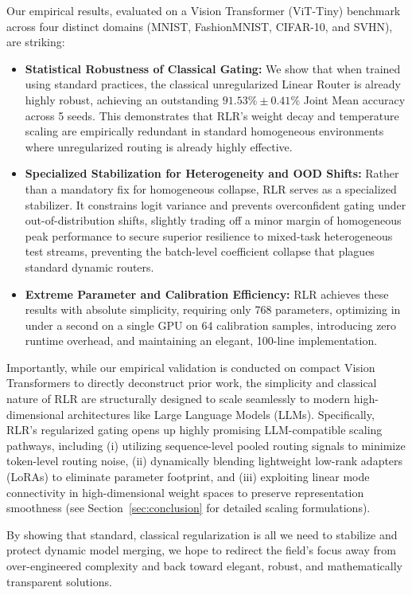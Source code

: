 Our empirical results, evaluated on a Vision Transformer (ViT-Tiny) benchmark across four distinct domains (MNIST, FashionMNIST, CIFAR-10, and SVHN), are striking:
\begin{itemize}
    \item \textbf{Statistical Robustness of Classical Gating:} We show that when trained using standard practices, the classical unregularized Linear Router is already highly robust, achieving an outstanding $91.53\% \pm 0.41\%$ Joint Mean accuracy across 5 seeds. This demonstrates that RLR's weight decay and temperature scaling are empirically redundant in standard homogeneous environments where unregularized routing is already highly effective.
    \item \textbf{Specialized Stabilization for Heterogeneity and OOD Shifts:} Rather than a mandatory fix for homogeneous collapse, RLR serves as a specialized stabilizer. It constrains logit variance and prevents overconfident gating under out-of-distribution shifts, slightly trading off a minor margin of homogeneous peak performance to secure superior resilience to mixed-task heterogeneous test streams, preventing the batch-level coefficient collapse that plagues standard dynamic routers.
    \item \textbf{Extreme Parameter and Calibration Efficiency:} RLR achieves these results with absolute simplicity, requiring only 768 parameters, optimizing in under a second on a single GPU on 64 calibration samples, introducing zero runtime overhead, and maintaining an elegant, 100-line implementation.
\end{itemize}

Importantly, while our empirical validation is conducted on compact Vision Transformers to directly deconstruct prior work, the simplicity and classical nature of RLR are structurally designed to scale seamlessly to modern high-dimensional architectures like Large Language Models (LLMs). Specifically, RLR's regularized gating opens up highly promising LLM-compatible scaling pathways, including (i) utilizing sequence-level pooled routing signals to minimize token-level routing noise, (ii) dynamically blending lightweight low-rank adapters (LoRAs) to eliminate parameter footprint, and (iii) exploiting linear mode connectivity in high-dimensional weight spaces to preserve representation smoothness (see Section~\ref{sec:conclusion} for detailed scaling formulations).

By showing that standard, classical regularization is all we need to stabilize and protect dynamic model merging, we hope to redirect the field's focus away from over-engineered complexity and back toward elegant, robust, and mathematically transparent solutions.
